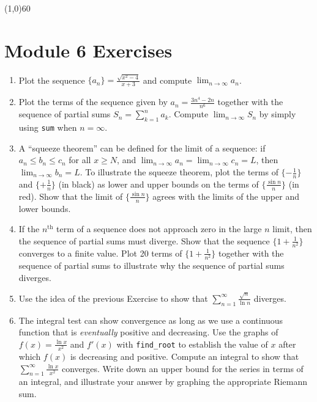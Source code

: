\documentclass[10.5pt,twoside]{report}
\theoremstyle{definition}
\begin{document}
\line(1,0){60}
\linethickness{0.5mm}
\pagebreak

\section{Module 6 Exercises}\label{Module 6 Exercises}

\begin{enumerate}


\item  Plot the sequence $\lbrace a_n \rbrace = \frac{\sqrt{x^2-4}}{x+3}$ and compute $\lim_{n\to \infty} a_n$.

\item  Plot the terms of the sequence given by $a_n=\frac{3n^4-2n}{n^6}$ together with the sequence of partial sums $S_n=\sum_{k=1}^{n} a_k$.  Compute $\lim_{n\to \infty} S_n$ by simply using \verb|sum| when $n=\infty$.

\item  A ``squeeze theorem'' can be defined for the limit of a sequence:  if $a_n \leq b_n \leq c_n$ for all $x\geq N$, and $\lim_{n\to \infty} a_n =\lim_{n\to \infty} c_n =L$, then $\lim_{n\to \infty} b_n = L$.  To illustrate the squeeze theorem, plot the terms of $\lbrace -\frac{1}{n} \rbrace$ and $\lbrace +\frac{1}{n} \rbrace$ (in black) as lower and upper bounds on the terms of $\lbrace \frac{\sin{n}}{n} \rbrace$ (in red).  Show that the limit of $\lbrace \frac{\sin{n}}{n} \rbrace$ agrees with the limits of the upper and lower bounds.

\item  If the $n^{\mathrm{th}}$ term of a sequence does not approach zero in the large $n$ limit, then the sequence of partial sums must diverge.  Show that the sequence $\lbrace 1+\frac{1}{n^2} \rbrace$ converges to a finite value.  Plot 20 terms of $\lbrace 1+\frac{1}{n^2} \rbrace$ together with the sequence of partial sums to illustrate why the sequence of partial sums diverges.

\item Use the idea of the previous Exercise to show that $\sum_{n=1}^{\infty} \frac{\sqrt{n}}{\ln{n}}$ diverges.

\item  The integral test can show convergence as long as we use a continuous function that is \textit{eventually} positive and decreasing.  Use the graphs of $f(x)=\frac{\ln{x}}{x^2}$ and $f'(x)$ with \verb|find_root| to establish the value of $x$ after which $f(x)$ is decreasing and positive.  Compute an integral to show that $\sum_{n=1}^{\infty} \frac{\ln{x}}{x^2}$ converges.  Write down an upper bound for the series in terms of an integral, and illustrate your answer by graphing the appropriate Riemann sum.


\end{enumerate}
\end{document}
